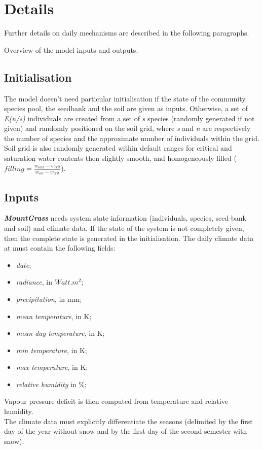\documentclass[a4paper,twoside, justified,marginals=raggedright, nobib]{tufte-handout}
\newcommand{\model}{\textit{\textbf{MountGrass }}}
\begin{document}
\section{Details}

Further details on daily mechanisms are described in the following paragraphs.


\begin{marginfigure}
\caption{Overview of the model inputs and outputs.}
\end{marginfigure}

\subsection{Initialisation}
The model doesn't need particular initialisation if the state of the community species pool, the seedbank and the soil are given as inputs. Otherwise, a set of \textit{E(n/s)} individuals are created from a set of \textit{s} species (randomly generated if not given) and randomly positioned on the soil grid, where \textit{s} and \textit{n} are respectively the number of species and the approximate number of individuals within the grid. Soil grid is also randomly generated within default ranges for critical and saturation water contents then slightly smooth, and homogeneously filled ($filling = \frac{w_{cont} - w_{crit}}{w_{sat} - w_{crit}}$).

\subsection{Inputs}
\model needs system state information (individuals, species, seed-bank and soil) and climate data. If the state of the system is not completely given, then the complete state is generated in the initialisation. The daily climate data at must contain the following fields:
\begin{itemize}
\setlength\itemsep{0em}
\item \textit{date};
\item \textit{radiance}, in $Watt.m^{2}$;
\item \textit{precipitation}, in mm;
\item \textit{mean temperature}, in K;
\item \textit{mean day temperature}, in K;
\item \textit{min temperature}, in K;
\item \textit{max temperature}, in K;
\item \textit{relative humidity} in \%;
\end{itemize}
Vapour pressure deficit is then computed from temperature and relative humidity.\\
\indent The climate data must explicitly differentiate the seasons (delimited by the first day of the year without snow and by the first day of the second semester with snow).
\end{document}
